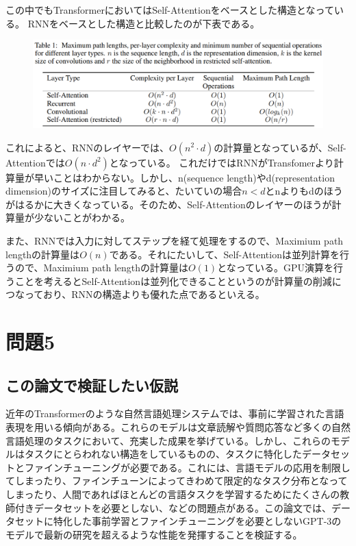 \documentclass[a4j,11pt]{jarticle}
\begin{document}
この中でもTransformerにおいてはSelf-Attentionをベースとした構造となっている。
RNNをベースとした構造と比較したのが下表\cite{Attention}である。
\begin{figure}[hbtp]
    \centering
    \includegraphics[width=12cm]{p4-1.png}
\end{figure}

これによると、RNNのレイヤーでは、$O(n^2\cdot d)$の計算量となっているが、Self-Attentionでは$O(n \cdot d^2)$となっている。
これだけではRNNがTransfomerより計算量が早いことはわからない。しかし、n(sequence length)やd(representation dimension)のサイズに注目してみると、たいていの場合$n < d$とnよりもdのほうがはるかに大きくなっている。そのため、Self-Attentionのレイヤーのほうが計算量が少ないことがわかる。

また、RNNでは入力に対してステップを経て処理をするので、Maximium path lengthの計算量は$O(n)$である。それにたいして、Self-Attentionは並列計算を行うので、Maximium path lengthの計算量は$O(1)$となっている。GPU演算を行うことを考えるとSelf-Attentionは並列化できることというのが計算量の削減につなっており、RNNの構造よりも優れた点であるといえる。


\newpage
\section{問題5}
\subsection*{この論文で検証したい仮説}
近年のTransformerのような自然言語処理システムでは、事前に学習された言語表現を用いる傾向がある。これらのモデルは文章読解や質問応答など多くの自然言語処理のタスクにおいて、充実した成果を挙げている。しかし、これらのモデルはタスクにとらわれない構造をしているものの、タスクに特化したデータセットとファインチューニングが必要である。これには、言語モデルの応用を制限してしまったり、ファインチューンによってきわめて限定的なタスク分布となってしまったり、人間であればほとんどの言語タスクを学習するためにたくさんの教師付きデータセットを必要としない、などの問題点がある。この論文では、データセットに特化した事前学習とファインチューニングを必要としないGPT-3のモデルで最新の研究を超えるような性能を発揮することを検証する。
\end{document}
